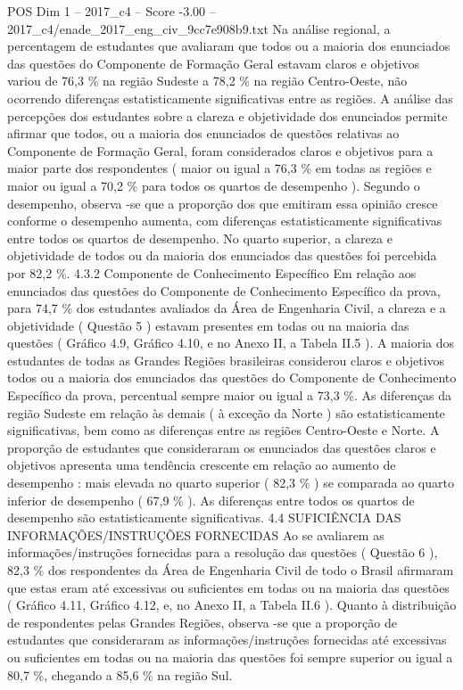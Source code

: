 \begin{textsample}{POS Dim 1 – 2017\_c4 – Score -3.00 – 2017\_c4/enade\_2017\_eng\_civ\_9cc7e908b9.txt}
Na análise regional, a percentagem de estudantes que avaliaram que todos ou a maioria dos enunciados das questões do Componente de Formação Geral estavam claros e objetivos variou de 76,3 \% na região Sudeste a 78,2 \% na região Centro-Oeste, não ocorrendo diferenças estatisticamente significativas entre as regiões.
A análise das percepções dos estudantes sobre a clareza e objetividade dos enunciados permite afirmar que todos, ou a maioria dos enunciados de questões relativas ao Componente de Formação Geral, foram considerados claros e objetivos para a maior parte dos respondentes ( maior ou igual a 76,3 \% em todas as regiões e maior ou igual a 70,2 \% para todos os quartos de desempenho ).
Segundo o desempenho, observa -se que a proporção dos que emitiram essa opinião cresce conforme o desempenho aumenta, com diferenças estatisticamente significativas entre todos os quartos de desempenho.
No quarto superior, a clareza e objetividade de todos ou da maioria dos enunciados das questões foi percebida por 82,2 \%. 4.3.2 Componente de Conhecimento Específico Em relação aos enunciados das questões do Componente de Conhecimento Específico da prova, para 74,7 \% dos estudantes avaliados da Área de Engenharia Civil, a clareza e a objetividade ( Questão 5 ) estavam presentes em todas ou na maioria das questões ( Gráfico 4.9, Gráfico 4.10, e no Anexo II, a Tabela II.5 ).
A maioria dos estudantes de todas as Grandes Regiões brasileiras considerou claros e objetivos todos ou a maioria dos enunciados das questões do Componente de Conhecimento Específico da prova, percentual sempre maior ou igual a 73,3 \%.
As diferenças da região Sudeste em relação às demais ( à exceção da Norte ) são estatisticamente significativas, bem como as diferenças entre as regiões Centro-Oeste e Norte.
A proporção de estudantes que consideraram os enunciados das questões claros e objetivos apresenta uma tendência crescente em relação ao aumento de desempenho : mais elevada no quarto superior ( 82,3 \% ) se comparada ao quarto inferior de desempenho ( 67,9 \% ).
As diferenças entre todos os quartos de desempenho são estatisticamente significativas. 4.4 SUFICIÊNCIA DAS INFORMAÇÕES/INSTRUÇÕES FORNECIDAS Ao se avaliarem as informações/instruções fornecidas para a resolução das questões ( Questão 6 ), 82,3 \% dos respondentes da Área de Engenharia Civil de todo o Brasil afirmaram que estas eram até excessivas ou suficientes em todas ou na maioria das questões ( Gráfico 4.11, Gráfico 4.12, e, no Anexo II, a Tabela II.6 ).
Quanto à distribuição de respondentes pelas Grandes Regiões, observa -se que a proporção de estudantes que consideraram as informações/instruções fornecidas até excessivas ou suficientes em todas ou na maioria das questões foi sempre superior ou igual a 80,7 \%, chegando a 85,6 \% na região Sul.

\end{textsample}
